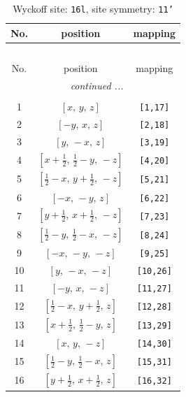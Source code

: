 \documentclass[fleqn,8pt]{jsarticle}
\begin{document}
\begin{longtable}{ccc}
\caption{Wyckoff site: {\tt 16l}, site symmetry: {\tt 11'}}
 \\
 \hline \hline
No. & position & mapping \\ \hline \endfirsthead

\multicolumn{2}{l}{\tablename\ \thetable{}} \\
 \hline \hline
No. & position & mapping \\ \hline \endhead

 \hline \hline
\multicolumn{2}{r}{\footnotesize\it continued ...} \\ \endfoot

 \hline \hline
\multicolumn{2}{r}{} \\ \endlastfoot

1 & $\left[ x,\, y,\, z \right]$ & {\tt [1,17]} \\ \hline
2 & $\left[ - y,\, x,\, z \right]$ & {\tt [2,18]} \\ \hline
3 & $\left[ y,\, - x,\, z \right]$ & {\tt [3,19]} \\ \hline
4 & $\left[ x + \frac{1}{2},\, \frac{1}{2} - y,\, - z \right]$ & {\tt [4,20]} \\ \hline
5 & $\left[ \frac{1}{2} - x,\, y + \frac{1}{2},\, - z \right]$ & {\tt [5,21]} \\ \hline
6 & $\left[ - x,\, - y,\, z \right]$ & {\tt [6,22]} \\ \hline
7 & $\left[ y + \frac{1}{2},\, x + \frac{1}{2},\, - z \right]$ & {\tt [7,23]} \\ \hline
8 & $\left[ \frac{1}{2} - y,\, \frac{1}{2} - x,\, - z \right]$ & {\tt [8,24]} \\ \hline
9 & $\left[ - x,\, - y,\, - z \right]$ & {\tt [9,25]} \\ \hline
10 & $\left[ y,\, - x,\, - z \right]$ & {\tt [10,26]} \\ \hline
11 & $\left[ - y,\, x,\, - z \right]$ & {\tt [11,27]} \\ \hline
12 & $\left[ \frac{1}{2} - x,\, y + \frac{1}{2},\, z \right]$ & {\tt [12,28]} \\ \hline
13 & $\left[ x + \frac{1}{2},\, \frac{1}{2} - y,\, z \right]$ & {\tt [13,29]} \\ \hline
14 & $\left[ x,\, y,\, - z \right]$ & {\tt [14,30]} \\ \hline
15 & $\left[ \frac{1}{2} - y,\, \frac{1}{2} - x,\, z \right]$ & {\tt [15,31]} \\ \hline
16 & $\left[ y + \frac{1}{2},\, x + \frac{1}{2},\, z \right]$ & {\tt [16,32]} \\
\end{longtable}
\end{document}
